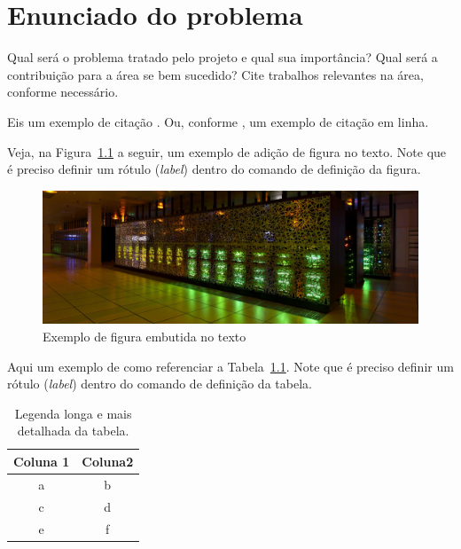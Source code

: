 \chapter{Enunciado do problema}\label{chp:introducao} 
Qual será o problema tratado pelo projeto e qual sua importância? Qual será a contribuição para a área se bem sucedido? Cite trabalhos relevantes na área, conforme necessário.

Eis um exemplo de citação \cite{Gradvohl2014}. Ou, conforme \textcite{Gradvohl2014}, um exemplo de citação em linha.

Veja, na Figura~\ref{fig:supercomputador} a seguir, um exemplo de adição de figura no texto. Note que é preciso definir um rótulo (\textit{label}) dentro do comando de definição da figura.

\begin{figure}[!htb]
    \centering
    \includegraphics[width=.9\textwidth]{figuras/Supercomputer.jpg}
    \caption{Exemplo de figura embutida no texto}
    \label{fig:supercomputador}
\end{figure}

Aqui um exemplo de como referenciar a Tabela~\ref{tab:tabela_1}. Note que é preciso definir um rótulo (\textit{label}) dentro do comando de definição da tabela.

\begin{table}[!htp]
\caption[Legenda curta da tabela]{Legenda longa e mais detalhada da tabela.}
\label{tab:tabela_1}
\begin{center}
\begin{tabular}{cc}
\toprule %
Coluna 1 & Coluna2 \\ \midrule %
a & b \\
c & d \\
e & f \\\bottomrule %
\end{tabular}
\end{center}
\end{table}